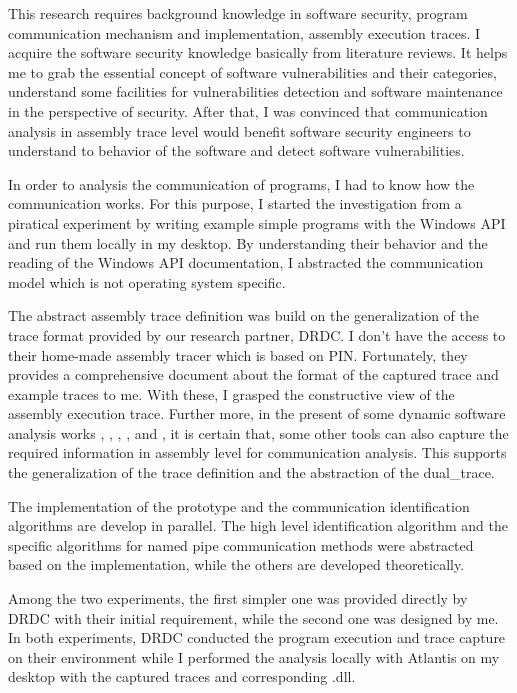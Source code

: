 This research requires background knowledge in software security, program communication mechanism and implementation, assembly execution traces. I acquire the software security knowledge basically from literature reviews. It helps me to grab the essential concept of software vulnerabilities and their categories, understand some facilities for vulnerabilities detection and software maintenance in the perspective of security. After that, I was convinced that communication analysis in assembly trace level would benefit software security engineers to understand to behavior of the software and detect software vulnerabilities. 

In order to analysis the communication of programs, I had to know how the communication works. For this purpose, I started the investigation from a piratical experiment by writing example simple programs with the Windows API and run them locally in my desktop. By understanding their behavior and the reading of the Windows API documentation, I abstracted the communication model which is not operating system specific.

The abstract assembly trace definition was build on the generalization of the trace format provided by our research partner, DRDC. I don't have the access to their home-made assembly tracer which is based on PIN\cite{_pin_????}. Fortunately, they provides a comprehensive document about the format of the captured trace and example traces to me. With these, I grasped the constructive view of the assembly execution trace. Further more, in the present of some dynamic software analysis works \cite{godefroid2008automated}, \cite{li2013software}, \cite{sailer2016coretana}, \cite{balakrishnan2004analyzing}, \cite{bhansali2006framework} and \cite{trumper2012maintenance}, it is certain that, some other tools can also capture the required information in assembly level for communication analysis. This supports the generalization of the trace definition and the abstraction of the dual\_trace.

The implementation of the prototype and the communication identification algorithms are develop in parallel. The high level identification algorithm and the specific algorithms for named pipe communication methods were abstracted based on the implementation, while the others are developed theoretically.

Among the two experiments, the first simpler one was provided directly by DRDC with their initial requirement, while the second one was designed by me. In both experiments, DRDC conducted the program execution and trace capture on their environment while I performed the analysis locally with Atlantis on my desktop with the captured traces and corresponding .dll.


